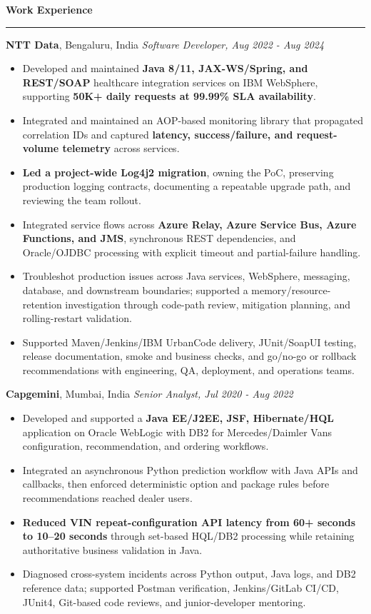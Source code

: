 \documentclass[11pt,letterpaper]{article}
\newcommand{\ressection}[1]{\Needspace{6\baselineskip}\vspace{8pt}\par\textbf{#1}\par\vspace{2pt}\hrule\vspace{5pt}}
\begin{document}
\ressection{Work Experience}
\textbf{NTT Data}, Bengaluru, India \hfill \textit{Software Developer, Aug 2022 - Aug 2024}
\begin{itemize}
  \item Developed and maintained \textbf{Java 8/11, JAX-WS/Spring, and REST/SOAP} healthcare integration services on IBM WebSphere, supporting \textbf{50K+ daily requests at 99.99\% SLA availability}.
  \item Integrated and maintained an AOP-based monitoring library that propagated correlation IDs and captured \textbf{latency, success/failure, and request-volume telemetry} across services.
  \item \textbf{Led a project-wide Log4j2 migration}, owning the PoC, preserving production logging contracts, documenting a repeatable upgrade path, and reviewing the team rollout.
  \item Integrated service flows across \textbf{Azure Relay, Azure Service Bus, Azure Functions, and JMS}, synchronous REST dependencies, and Oracle/OJDBC processing with explicit timeout and partial-failure handling.
  \item Troubleshot production issues across Java services, WebSphere, messaging, database, and downstream boundaries; supported a memory/resource-retention investigation through code-path review, mitigation planning, and rolling-restart validation.
  \item Supported Maven/Jenkins/IBM UrbanCode delivery, JUnit/SoapUI testing, release documentation, smoke and business checks, and go/no-go or rollback recommendations with engineering, QA, deployment, and operations teams.
\end{itemize}
\textbf{Capgemini}, Mumbai, India \hfill \textit{Senior Analyst, Jul 2020 - Aug 2022}
\begin{itemize}
  \item Developed and supported a \textbf{Java EE/J2EE, JSF, Hibernate/HQL} application on Oracle WebLogic with DB2 for Mercedes/Daimler Vans configuration, recommendation, and ordering workflows.
  \item Integrated an asynchronous Python prediction workflow with Java APIs and callbacks, then enforced deterministic option and package rules before recommendations reached dealer users.
  \item \textbf{Reduced VIN repeat-configuration API latency from 60+ seconds to 10--20 seconds} through set-based HQL/DB2 processing while retaining authoritative business validation in Java.
  \item Diagnosed cross-system incidents across Python output, Java logs, and DB2 reference data; supported Postman verification, Jenkins/GitLab CI/CD, JUnit4, Git-based code reviews, and junior-developer mentoring.
\end{itemize}
\end{document}
